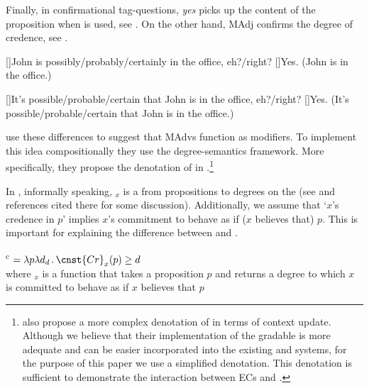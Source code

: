\documentclass[output=paper,colorlinks,citecolor=brown,newtxmath]{langsci/langscibook}
\begin{document}
 	\ea \label{madvif} 
        \z\z

\noindent Finally, in confirmational tag-questions, \textit{yes} picks up the content of the proposition when  is used, see . On the other hand, MAdj confirms the degree of credence, see .

	\ea \ea\label{madvyesa}
	\begin{xlist}
	[]{John is possibly/probably/certainly in the office, eh?/right?}
	[]{Yes. (John is in the office.)}
		\end{xlist}
	\ex\label{madvyesb}
	\begin{xlist}
	[]{It's possible/probable/certain that John is in the office, eh?/right?}
    []{Yes. (It's possible/probable/certain that John is in the office.)}
	\end{xlist}
        \z \z

\noindent \citet{grewol17} use these differences to suggest that MAdvs function as  modifiers. To implement this idea compositionally they use the degree-semantics framework. More specifically, they propose the denotation of  in .\footnote{\citet{grewol17} also propose a more complex denotation of  in terms of context update.
Although we believe that their implementation of the gradable  is more adequate and can be easier incorporated into the existing  and  systems, for the purpose of this paper we use a simplified denotation. This denotation is sufficient  to demonstrate the interaction between ECs and .}

In , informally speaking, $_{x}$ is a  from propositions to degrees on the  (see \citealt{herrub14} and references cited there for some discussion). Additionally, we assume that `$x$'s credence in $p$' implies $x$'s commitment to behave as if ($x$ believes that) $p$. This is important for explaining the difference between  and .

	\ea {}\textsuperscript{c} $= \lambda p\lambda d_d\,.\, \cnst{Cr}_{x}(p) \geq d $ \\
    where $_{x}$ is a function that takes a proposition $p$ and returns a degree to which $x$ is committed to behave as if $x$ believes that $p$ \label{assert}
    \z
\end{document}
